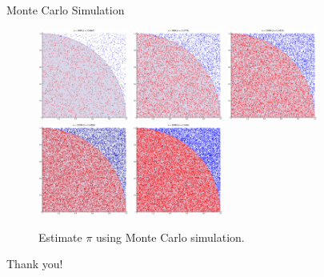 \documentclass{beamer}
\begin{document}
\begin{frame}{Monte Carlo Simulation}
\begin{figure}
\includegraphics[width=3cm]{Pi_30K1}
\includegraphics[width=3cm]{Pi_30K2}
\includegraphics[width=3cm]{Pi_30K3}\\
\includegraphics[width=3cm]{Pi_30K4}
\includegraphics[width=3cm]{Pi_30K5}
\caption{\label{fig:your-figure}Estimate $\pi$ using Monte Carlo simulation.}
\end{figure}
\end{frame}

\begin{frame}
\begin{center}
\huge Thank you!
\end{center}
\end{frame}
\end{document}
